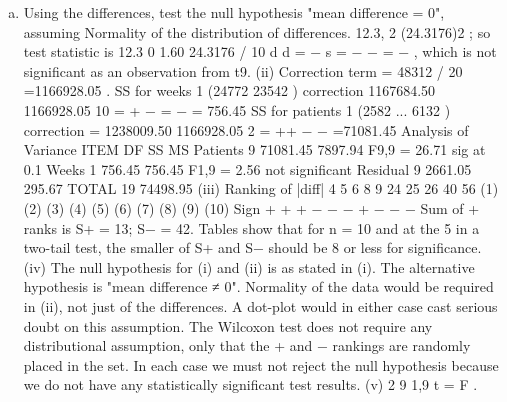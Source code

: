 \documentclass[a4paper,12pt]{article}
\begin{document}

\begin{enumerate}[(a)]
\item  Using the differences, test the null hypothesis "mean difference = 0", assuming
Normality of the distribution of differences.
12.3, 2 (24.3176)2 ; so test statistic is 12.3 0 1.60
24.3176 / 10 d d = − s = − − = − , which is not
significant as an observation from t9.
(ii) Correction term = 48312 / 20 =1166928.05 .
SS for weeks 1 (24772 23542 ) correction 1167684.50 1166928.05
10
= + − = −
= 756.45
SS for patients 1 (2582 ... 6132 ) correction = 1238009.50 1166928.05
2
= ++ − −
=71081.45
Analysis of Variance
ITEM DF SS MS
Patients 9 71081.45 7897.94 F9,9 = 26.71 sig at 0.1%
Weeks 1 756.45 756.45 F1,9 = 2.56 not significant
Residual 9 2661.05 295.67
TOTAL 19 74498.95
(iii)
Ranking of |diff| 4 5 6 8 9 24 25 26 40 56
(1) (2) (3) (4) (5) (6) (7) (8) (9) (10)
Sign + + + − − − + − − −
Sum of + ranks is S+ = 13; S− = 42. Tables show that for n = 10 and at the 5%
in a two-tail test, the smaller of S+ and S− should be 8 or less for significance.
(iv) The null hypothesis for (i) and (ii) is as stated in (i). The alternative
hypothesis is "mean difference ≠ 0". Normality of the data would be required in (ii),
not just of the differences. A dot-plot would in either case cast serious doubt on this
assumption. The Wilcoxon test does not require any distributional assumption, only
that the + and − rankings are randomly placed in the set. In each case we must not
reject the null hypothesis because we do not have any statistically significant test
results.
(v) 2
9 1,9 t = F .


\end{enumerate}
\end{document}
